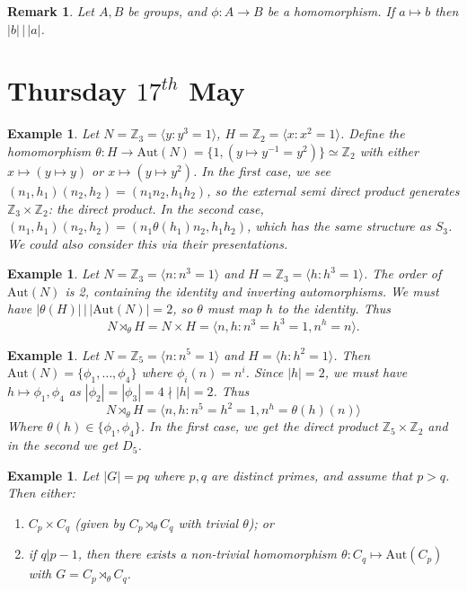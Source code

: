 \documentclass[a4paper,10pt]{article}
\newcommand{\ZZ}{\mathbb{Z}}
\newtheorem{eg}[thm]{Example}
\newtheorem{rem}[thm]{Remark}
\begin{document}
\begin{rem}
Let $A,B$ be groups, and $\phi : A \rightarrow B$ be a homomorphism. If $a \mapsto b$ then $|b| \, \big| \, |a|$.  
\end{rem}



\newpage
\section{Thursday $17^{th}$ May}

\begin{eg}
Let $N = \ZZ_3 = \langle y : y^3 = 1 \rangle $, $H = \ZZ_2 = \langle x : x^2 = 1 \rangle$. Define the homomorphism $\theta : H \rightarrow \text{Aut}(N) = \{ 1, (y \mapsto y^{-1} = y^2) \} \simeq \ZZ_2$ with either $x \mapsto  (y \mapsto y)$ or $x \mapsto (y \mapsto y^2)$. In the first case, we see $(n_1, h_1)(n_2, h_2) = (n_1 n_2, h_1h_2)$, so the external semi direct product generates $\ZZ_3 \times \ZZ_2$: the direct product. In the second case, $(n_1, h_1)(n_2, h_2) = (n_1 \theta(h_1) n_2, h_1 h_2)$, which has the same structure as $S_3$. We could also consider this via their presentations.
\end{eg}

\begin{eg}
Let $N = \ZZ_3 = \langle n : n^3 = 1 \rangle$ and $H = \ZZ_3 = \langle h : h^3 = 1 \rangle$.
The order of $\text{Aut}(N)$ is 2, containing the identity and inverting automorphisms. We must have $| \theta(H) | \, \big| \, |\text{Aut}(N) | = 2$, so $\theta$ must map $h$ to the identity. Thus
\[ N \rtimes_\theta H = N \times H = \langle n,h : n^3 = h^3 = 1, n^h = n \rangle. \]
\end{eg}

\begin{eg}
Let $N = \ZZ_5 = \langle n : n^5 = 1 \rangle$ and $H = \langle h : h^2 = 1 \rangle$. Then $\text{Aut}(N) = \{ \phi_1, \dots, \phi_4 \}$ where $\phi_i (n) = n^i$. Since $|h| = 2$, we must have $h \mapsto \phi_1, \phi_4$ as $|\phi_2| = |\phi_3| = 4 \nmid |h| = 2$. Thus
\[ N \rtimes_\theta H = \langle n,h : n^5 = h^2 = 1, n^h = \theta(h)(n) \rangle \]
Where $\theta(h)  \in \{ \phi_1, \phi_4 \}$. In the first case, we get the direct product $\ZZ_5 \times \ZZ_2$ and in the second we get $D_5$. 
\end{eg}

\begin{eg}
Let $|G| = pq$ where $p,q$ are distinct primes, and assume that $p > q$. Then either:
\begin{enumerate}
\item $C_p \times C_q$ (given by $C_p \rtimes_\theta C_q$ with trivial $\theta$); or
\item if $q | p -1$, then there exists a non-trivial homomorphism $\theta : C_q \mapsto \text{Aut}(C_p)$ with $G = C_p \rtimes_\theta C_q$.
\end{enumerate}

\end{eg}
\end{document}
